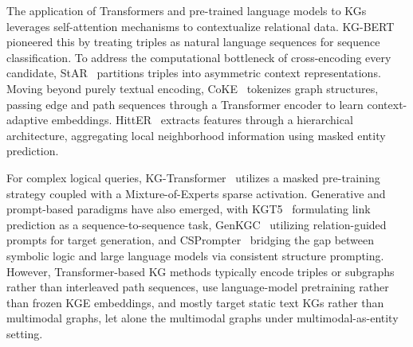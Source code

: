 \documentclass[runningheads]{llncs}
\begin{document}
The application of Transformers and pre-trained language models to KGs leverages self-attention mechanisms to contextualize relational data. KG-BERT~\cite{yao2019kg} pioneered this by treating triples as natural language sequences for sequence classification. To address the computational bottleneck of cross-encoding every candidate, StAR~\cite{wang2021star} partitions triples into asymmetric context representations. Moving beyond purely textual encoding, CoKE~\cite{wang2019coke} tokenizes graph structures, passing edge and path sequences through a Transformer encoder to learn context-adaptive embeddings. HittER~\cite{chen2021hitter} extracts features through a hierarchical architecture, aggregating local neighborhood information using masked entity prediction.

For complex logical queries, KG-Transformer~\cite{liu2022mask} utilizes a masked pre-training strategy coupled with a Mixture-of-Experts sparse activation. Generative and prompt-based paradigms have also emerged, with KGT5~\cite{saxena2022kgt5} formulating link prediction as a sequence-to-sequence task, GenKGC~\cite{zhu2022genkgc} utilizing relation-guided prompts for target generation, and CSPrompter~\cite{chen2023csprompter} bridging the gap between symbolic logic and large language models via consistent structure prompting. However, Transformer-based KG methods typically encode triples or subgraphs rather than interleaved path sequences, use language-model pretraining rather than frozen KGE embeddings, and mostly target static text KGs rather than multimodal graphs, let alone the multimodal graphs under multimodal-as-entity setting.


\end{document}
